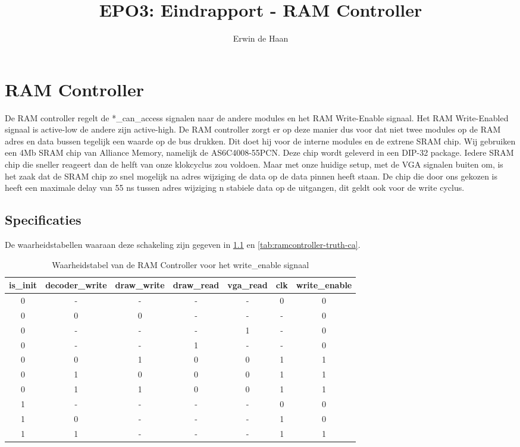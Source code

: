 \documentclass{scrreprt} %
\author{Erwin de Haan}%
\title{EPO3: Eindrapport - RAM Controller}
\begin{document}
\chapter{RAM Controller} %
\label{ch:ram-controller} %

De RAM controller regelt de *\_can\_access signalen naar de andere modules en het RAM Write-Enable signaal. Het RAM Write-Enabled signaal is active-low de andere zijn active-high.
De RAM controller zorgt er op deze manier dus voor dat niet twee modules op de RAM adres en data bussen tegelijk een waarde op de bus drukken.
Dit doet hij voor de interne modules en de extrene SRAM chip.
Wij gebruiken een 4Mb SRAM chip van Alliance Memory, namelijk de AS6C4008-55PCN. 
Deze chip wordt geleverd in een DIP-32 package.
Iedere SRAM chip die sneller reageert dan de helft van onze klokcyclus zou voldoen.
Maar met onze huidige setup, met de VGA signalen buiten om, is het zaak dat de SRAM chip zo snel mogelijk na adres wijziging de data op de data pinnen heeft staan.
De chip die door ons gekozen is heeft een maximale delay van 55 ns tussen adres wijziging n stabiele data op de uitgangen, dit geldt ook voor de write cyclus.



\section{Specificaties}
De waarheidstabellen waaraan deze schakeling zijn gegeven in \ref{tab:ramcontroller-truth-re} en \ref{tab:ramcontroller-truth-ca}.

\begin{table}[H]
\centering
\caption{Waarheidstabel van de RAM Controller voor het write\_enable signaal}
\label{tab:ramcontroller-truth-re}
\begin{tabular}{c c c c c c | c}
	\hline\hline
 	is\_init & decoder\_write & draw\_write & draw\_read & vga\_read & clk & write\_enable\\
 	\hline	
	0 & - & - & - & - & 0 & 0\\
	0 & 0 & 0 & - & - & - & 0\\
	0 & - & - & - & 1 & - & 0\\
	0 & - & - & 1 & - & - & 0\\
	0 & 0 & 1 & 0 & 0 & 1 & 1\\
	0 & 1 & 0 & 0 & 0 & 1 & 1\\
	0 & 1 & 1 & 0 & 0 & 1 & 1\\
	1 & - & - & - & - & 0 & 0\\
	1 & 0 & - & - & - & 1 & 0\\
	1 & 1 & - & - & - & 1 & 1\\
  	\hline
\end{tabular}
\end{table}
\end{document}
